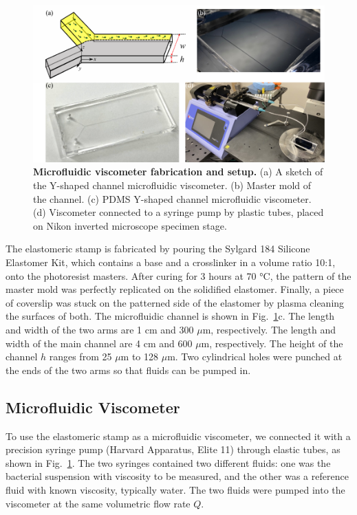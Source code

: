 \begin{figure}[!ht]
	\begin{center}
	\includegraphics[width=5.5 in]{Figs/2-Exp/7.pdf}
	\end{center}
	\caption[Microfluidic viscometer fabrication and setup.]
	{
	\textbf{Microfluidic viscometer fabrication and setup.}
	(a) A sketch of the Y-shaped channel microfluidic viscometer.
	(b) Master mold of the channel.
	(c) PDMS Y-shaped channel microfluidic viscometer.
	(d) Viscometer connected to a syringe pump by plastic tubes, placed on Nikon inverted microscope specimen stage.
	}
	\label{fig:experiment-microfluidics}
\end{figure}

The elastomeric stamp is fabricated by pouring the Sylgard 184 Silicone Elastomer Kit, which contains a base and a crosslinker in a volume ratio 10:1, onto the photoresist masters. After curing for 3 hours at 70 °C, the pattern of the master mold was perfectly replicated on the solidified elastomer. Finally, a piece of coverslip was stuck on the patterned side of the elastomer by plasma cleaning the surfaces of both. The microfluidic channel is shown in Fig.~\ref{fig:experiment-microfluidics}c. The length and width of the two arms are 1 cm and 300 $\mu$m, respectively. The length and width of the main channel are 4 cm and 600 $\mu$m, respectively. The height of the channel $h$ ranges from 25 $\mu$m to 128 $\mu$m. Two cylindrical holes were punched at the ends of the two arms so that fluids can be pumped in.

\subsection{Microfluidic Viscometer}


To use the elastomeric stamp as a microfluidic viscometer, we connected it with a precision syringe pump (Harvard Apparatus, Elite 11) through elastic tubes, as shown in Fig.~\ref{fig:experiment-microfluidics}. The two syringes contained two different fluids: one was the bacterial suspension with viscosity to be measured, and the other was a reference fluid with known viscosity, typically water. The two fluids were pumped into the viscometer at the same volumetric flow rate $Q$.

